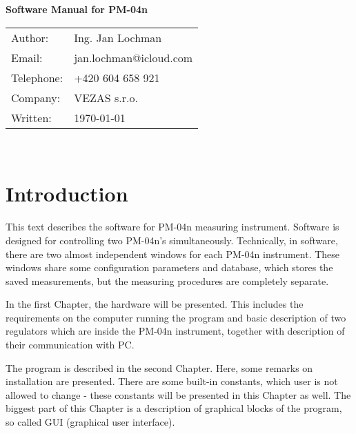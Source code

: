\documentclass[a4paper,11pt,twoside]{book}
\theoremstyle{named}
\begin{document}
\thispagestyle{empty}

\begin{center}

  \vspace*{40mm}

  {\huge \bf Software Manual for PM-04n}

  \vfill

  {\large
   \begin{tabular}{ll}
     Author:    & Ing. Jan Lochman \\
     Email:     & jan.lochman@icloud.com \\
     Telephone: & +420 604 658 921 \\
     Company:   & VEZAS s.r.o. \\
     Written:   & \today
   \end{tabular}
  }
\end{center}

\clearpage
{}
\setcounter{page}{1}
\tableofcontents 

\newpage
\thispagestyle{empty}
~

\newpage
\clearpage
{}
\setcounter{page}{1}

\chapter*{Introduction}

This text describes the software for PM-04n measuring instrument. Software is
designed for controlling two PM-04n's simultaneously. Technically, in software,
there are two almost independent windows for each PM-04n instrument. These
windows share some configuration parameters and database, which stores the saved
measurements, but the measuring procedures are completely separate.

In the first Chapter, the hardware will be presented. This includes the
requirements on the computer running the program and basic description of two
regulators which are inside the PM-04n instrument, together with description of
their communication with PC.

The program is described in the second Chapter. Here, some remarks on
installation are presented. There are some built-in constants, which user is not
allowed to change - these constants will be presented in this Chapter as well.
The biggest part of this Chapter is a description of graphical blocks of the
program, so called GUI (graphical user interface).
\end{document}
